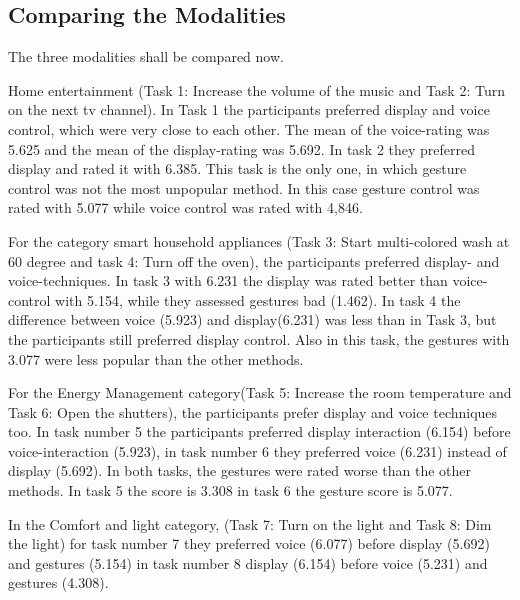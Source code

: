 \documentclass[sigchi]{acmart}
\begin{document}
	\subsection{Comparing the Modalities}
	
	The three modalities shall be compared now.
	
	Home entertainment (Task 1: Increase the volume of the music and Task 2: Turn on the next tv channel). In Task 1 the participants preferred display and voice control, which were very close to each other. The mean of the voice-rating was 5.625 and the mean of the display-rating was 5.692. In task 2 they preferred display and rated it with 6.385. This task is the only one, in which gesture control was not the most unpopular method. In this case gesture control was rated with 5.077 while voice control was rated with 4,846.
	
	For the category smart household appliances (Task 3: Start multi-colored wash at 60 degree  and task 4: Turn off the oven), the participants preferred display- and voice-techniques. In task 3 with 6.231 the display was rated better than voice-control with 5.154, while they assessed gestures bad (1.462). In task 4 the difference between voice (5.923) and display(6.231) was less than in Task 3, but the participants still preferred display control. Also in this task, the gestures with 3.077 were less popular than the other methods.
	
	For the Energy Management category(Task 5: Increase the room temperature and Task 6: Open the shutters), the participants prefer display and voice techniques too. In task number 5 the participants preferred display interaction (6.154) before voice-interaction (5.923), in task number 6 they preferred voice (6.231) instead of display (5.692). In both tasks, the gestures were rated worse than the other methods. In task 5 the score is 3.308 in task 6 the gesture score is 5.077.
	
	In the Comfort and light category, (Task 7: Turn on the light and Task 8: Dim the light) for task number 7 they preferred voice (6.077) before display (5.692) and gestures (5.154) in task number 8 display (6.154) before voice (5.231) and gestures (4.308). 
	
\end{document}
